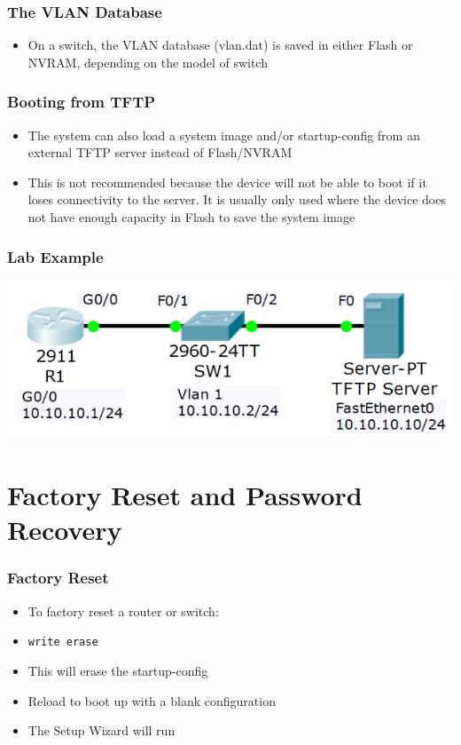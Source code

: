 \documentclass[pdflatex,compress,mathserif]{beamer}
\begin{document}
\begin{frame}
	\frametitle{The VLAN Database}
	\begin{itemize}
		\item On a switch, the VLAN database (vlan.dat) is saved in either Flash or NVRAM, depending on the model of switch
	\end{itemize}
\end{frame}

\begin{frame}
	\frametitle{Booting from TFTP}
	\begin{itemize}
		\item The system can also load a system image and/or startup-config from an external TFTP server instead of Flash/NVRAM
		\item This is not recommended because the device will not be able to boot if it loses connectivity to the server. It is usually only used where the device does not have enough capacity in Flash to save the system image
	\end{itemize}
\end{frame}

\begin{frame}
	\frametitle{Lab Example}
	\begin{center}
		\includegraphics[width=0.7\linewidth]{img/img01}
	\end{center}
\end{frame}

\section{Factory Reset and Password Recovery}

\begin{frame}
	\frametitle{Factory Reset}
	\begin{itemize}
		\item To factory reset a router or switch:
		\item[] \texttt{write erase}
		\item This will erase the startup-config
		\item Reload to boot up with a blank configuration
		\item The Setup Wizard will run
	\end{itemize}
\end{frame}
\end{document}

